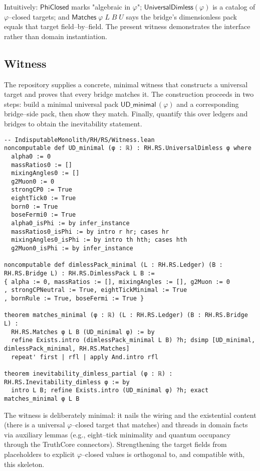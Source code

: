 \documentclass[11pt,a4paper,twoside]{article}
\numberwithin{equation}{section}
\newcommand{\phigr}{\varphi} %
\theoremstyle{customthm}
\theoremstyle{customdef}
\theoremstyle{customrem}
\begin{document}
\noindent Intuitively: $\mathsf{PhiClosed}$ marks "algebraic in $\phigr$"; $\mathsf{UniversalDimless}(\phigr)$ is a catalog of $\phigr$–closed targets; and $\mathsf{Matches}\;\phigr\;L\;B\;U$ says the bridge's dimensionless pack equals that target field–by–field. The present witness demonstrates the interface rather than domain instantiation.

\subsection{Witness}

The repository supplies a concrete, minimal witness that constructs a universal target and proves that every bridge matches it. The construction proceeds in two steps: build a minimal universal pack $\mathsf{UD\_minimal}\,(\phigr)$ and a corresponding bridge–side pack, then show they match. Finally, quantify this over ledgers and bridges to obtain the inevitability statement.

\begin{lstlisting}
-- IndisputableMonolith/RH/RS/Witness.lean
noncomputable def UD_minimal (φ : ℝ) : RH.RS.UniversalDimless φ where
  alpha0 := 0
  massRatios0 := []
  mixingAngles0 := []
  g2Muon0 := 0
  strongCP0 := True
  eightTick0 := True
  born0 := True
  boseFermi0 := True
  alpha0_isPhi := by infer_instance
  massRatios0_isPhi := by intro r hr; cases hr
  mixingAngles0_isPhi := by intro th hth; cases hth
  g2Muon0_isPhi := by infer_instance

noncomputable def dimlessPack_minimal (L : RH.RS.Ledger) (B : RH.RS.Bridge L) : RH.RS.DimlessPack L B :=
{ alpha := 0, massRatios := [], mixingAngles := [], g2Muon := 0
, strongCPNeutral := True, eightTickMinimal := True
, bornRule := True, boseFermi := True }

theorem matches_minimal (φ : ℝ) (L : RH.RS.Ledger) (B : RH.RS.Bridge L) :
  RH.RS.Matches φ L B (UD_minimal φ) := by
  refine Exists.intro (dimlessPack_minimal L B) ?h; dsimp [UD_minimal, dimlessPack_minimal, RH.RS.Matches]
  repeat' first | rfl | apply And.intro rfl

theorem inevitability_dimless_partial (φ : ℝ) : RH.RS.Inevitability_dimless φ := by
  intro L B; refine Exists.intro (UD_minimal φ) ?h; exact matches_minimal φ L B
\end{lstlisting}

\noindent The witness is deliberately minimal: it nails the wiring and the existential content (there is a universal $\phigr$–closed target that matches) and threads in domain facts via auxiliary lemmas (e.g., eight–tick minimality and quantum occupancy through the TruthCore connectors). Strengthening the target fields from placeholders to explicit $\phigr$–closed values is orthogonal to, and compatible with, this skeleton.
\end{document}
